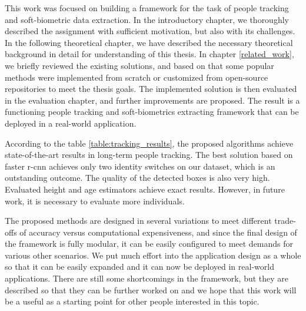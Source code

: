 \begin{conclusion}
    This work was focused on building a framework for the task of people tracking and soft-biometric data extraction. In the introductory chapter, we thoroughly described the assignment with sufficient motivation, but also with its challenges. In the following theoretical chapter, we have described the necessary theoretical background in detail for understanding of this thesis. In chapter \ref{related_work}, we briefly reviewed the existing solutions, and based on that some popular methods were implemented from scratch or customized from open-source repositories to meet the thesis goals. The implemented solution is then evaluated in the evaluation chapter, and further improvements are proposed. The result is a functioning people tracking and soft-biometrics extracting framework that can be deployed in a real-world application.
    
    According to the table \ref{table:tracking_results}, the proposed algorithms achieve {state-of-the-art} results in long-term people tracking. The best solution based on \gls{faster r-cnn} achieves only two identity switches on our dataset, which is an outstanding outcome. The quality of the detected boxes is also very high. Evaluated height and age estimators achieve exact results. However, in future work, it is necessary to evaluate more individuals.
    
    The proposed methods are designed in several variations to meet different trade-offs of accuracy versus computational expensiveness, and since the final design of the framework is fully modular, it can be easily configured to meet demands for various other scenarios. We put much effort into the application design as a whole so that it can be easily expanded and it can now be deployed in real-world applications. There are still some shortcomings in the framework, but they are described so that they can be further worked on and we hope that this work will be a useful as a starting point for other people interested in this topic. 

\end{conclusion}